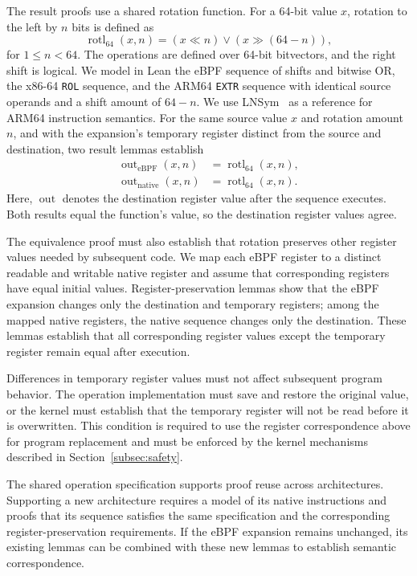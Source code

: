 The result proofs use a shared rotation function. For a 64-bit value $x$, rotation to the left by $n$ bits is defined as
\[
\operatorname{rotl}_{64}(x,n)=(x\ll n)\mathbin{\lor}(x\gg(64-n)),
\]
for $1\leq n<64$. The operations are defined over 64-bit bitvectors, and the right shift is logical. We model in Lean the eBPF sequence of shifts and bitwise OR, the x86-64 \texttt{ROL} sequence, and the ARM64 \texttt{EXTR} sequence with identical source operands and a shift amount of $64-n$. We use LNSym~\cite{lnsym} as a reference for ARM64 instruction semantics. For the same source value $x$ and rotation amount $n$, and with the expansion's temporary register distinct from the source and destination, two result lemmas establish
\[
\begin{aligned}
\operatorname{out}_{\mathrm{eBPF}}(x,n)&=\operatorname{rotl}_{64}(x,n),\\
\operatorname{out}_{\mathrm{native}}(x,n)&=\operatorname{rotl}_{64}(x,n).
\end{aligned}
\]
Here, $\operatorname{out}$ denotes the destination register value after the sequence executes. Both results equal the function's value, so the destination register values agree.

The equivalence proof must also establish that rotation preserves other register values needed by subsequent code. We map each eBPF register to a distinct readable and writable native register and assume that corresponding registers have equal initial values. Register-preservation lemmas show that the eBPF expansion changes only the destination and temporary registers; among the mapped native registers, the native sequence changes only the destination. These lemmas establish that all corresponding register values except the temporary register remain equal after execution.

Differences in temporary register values must not affect subsequent program behavior. The operation implementation must save and restore the original value, or the kernel must establish that the temporary register will not be read before it is overwritten. This condition is required to use the register correspondence above for program replacement and must be enforced by the kernel mechanisms described in Section~\ref{subsec:safety}.

The shared operation specification supports proof reuse across architectures. Supporting a new architecture requires a model of its native instructions and proofs that its sequence satisfies the same specification and the corresponding register-preservation requirements. If the eBPF expansion remains unchanged, its existing lemmas can be combined with these new lemmas to establish semantic correspondence.